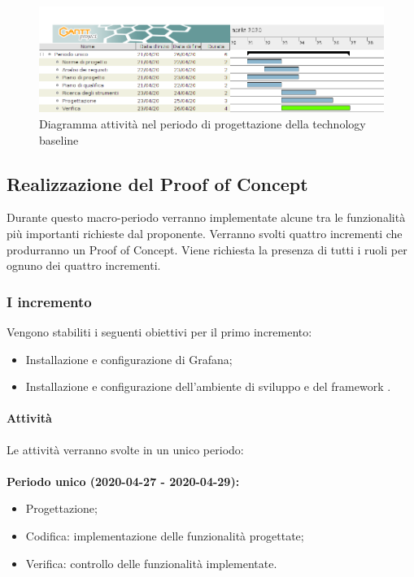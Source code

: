 \documentclass[../piano-di-progetto.tex]{subfiles}
\begin{document}
    


\newpage
\begin{landscape}
    \begin{figure}[H]
        \centering
        \includegraphics[width=24cm]{img/progettazione.png}
        \caption{Diagramma attività nel periodo di progettazione della technology baseline}
      \end{figure}
\end{landscape}

    
\newpage
\subsection{Realizzazione del Proof of Concept}

Durante questo macro-periodo verranno implementate alcune tra le funzionalità più importanti richieste dal proponente. Verranno svolti quattro incrementi che produrranno un Proof of Concept. Viene richiesta la presenza di tutti i ruoli per ognuno dei quattro incrementi.

\subsubsection{I incremento} 

 Vengono stabiliti i seguenti obiettivi per il primo incremento:
 \begin{itemize}
     \item Installazione e configurazione di Grafana;
     \item Installazione e configurazione dell'ambiente di sviluppo  e del framework .
 \end{itemize}
 
\paragraph{Attività}
Le attività verranno svolte in un unico periodo:
\\
\\
\textbf{Periodo unico (2020-04-27 - 2020-04-29):}
\begin{itemize}
    \item Progettazione;
    \item Codifica: implementazione delle funzionalità progettate;
    \item Verifica: controllo delle funzionalità implementate.
\end{itemize}
\end{document}
